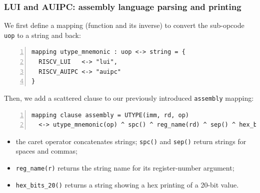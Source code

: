 \documentclass[aspectratio=169]{beamer}
\newcommand{\slidefont}{\scriptsize}
\newcommand{\cf}{\scriptsize\tt}
\begin{document}

\begin{frame}[fragile]
  \frametitle{LUI and AUIPC: assembly language parsing and printing}

  \slidefont

  We first define a mapping (function and its inverse) to convert the
  sub-opcode {\cf uop} to a string and back:

  \begin{Verbatim}[frame=single, numbers=left, label = File riscv\_insts\_base.sail]
mapping utype_mnemonic : uop <-> string = {
  RISCV_LUI   <-> "lui",
  RISCV_AUIPC <-> "auipc"
}
  \end{Verbatim}

  Then, we add a scattered clause to our previously introduced {\cf assembly} mapping:

  \begin{Verbatim}[frame=single, numbers=left, label = File riscv\_insts\_base.sail]
mapping clause assembly = UTYPE(imm, rd, op)
  <-> utype_mnemonic(op) ^ spc() ^ reg_name(rd) ^ sep() ^ hex_bits_20(imm)
  \end{Verbatim}

  \begin{minipage}{\textwidth}
    \begin{itemize}
    \item the caret operator concatenates strings; {\cf spc()} and {\cf sep()} return strings for spaces and commas;
    \item {\tt reg\_name(r)} returns the string name for its register-number argument;
    \item {\tt hex\_bits\_20()} returns a string showing a hex printing of a 20-bit value.
    \end{itemize}
  \end{minipage}

\end{frame}

\end{document}
